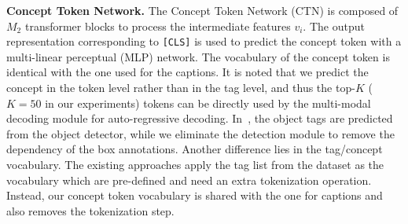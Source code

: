 \vspace{1mm}
\noindent \textbf{Concept Token Network.}
\label{sec:tagger}
The Concept Token Network (CTN) is composed of $M_2$ transformer blocks to process the intermediate
features $v_i$. The output representation corresponding to \texttt{[CLS]} is used to predict the 
concept token with a multi-linear perceptual (MLP) network. 
The vocabulary of the concept token is identical with the one used for the captions. 
It is noted that we predict the concept in the token level rather than in the tag level, and thus the top-$K$ ($K=50$ in our experiments) tokens can be directly used by the multi-modal decoding module for auto-regressive decoding. In~\citep{li2020oscar,zhang2021multi}, the object tags are predicted from the object detector, while we eliminate the detection module to remove the dependency of the box annotations. Another difference lies in the tag/concept vocabulary. The existing approaches apply the tag list from the dataset as the vocabulary which are pre-defined and need an extra tokenization operation. Instead, our concept token vocabulary is shared with the one for captions and also removes the tokenization step.






